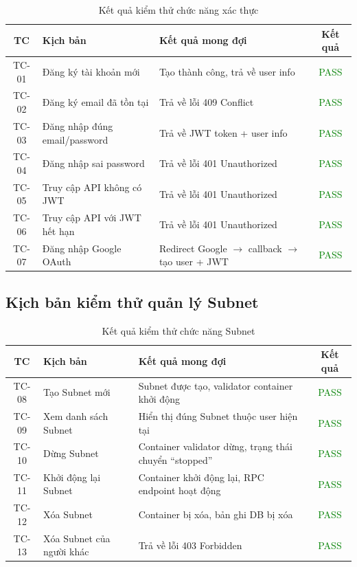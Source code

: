 \begin{table}[H]
\centering
\caption{Kết quả kiểm thử chức năng xác thực}
\label{tab:test_auth}
\begin{tabular}{|c|p{4cm}|p{4cm}|c|}
\hline
\textbf{TC} & \textbf{Kịch bản} & \textbf{Kết quả mong đợi} & \textbf{Kết quả} \\ \hline
TC-01 & Đăng ký tài khoản mới & Tạo thành công, trả về user info & \textcolor{green}{PASS} \\ \hline
TC-02 & Đăng ký email đã tồn tại & Trả về lỗi 409 Conflict & \textcolor{green}{PASS} \\ \hline
TC-03 & Đăng nhập đúng email/password & Trả về JWT token + user info & \textcolor{green}{PASS} \\ \hline
TC-04 & Đăng nhập sai password & Trả về lỗi 401 Unauthorized & \textcolor{green}{PASS} \\ \hline
TC-05 & Truy cập API không có JWT & Trả về lỗi 401 Unauthorized & \textcolor{green}{PASS} \\ \hline
TC-06 & Truy cập API với JWT hết hạn & Trả về lỗi 401 Unauthorized & \textcolor{green}{PASS} \\ \hline
TC-07 & Đăng nhập Google OAuth & Redirect Google $\rightarrow$ callback $\rightarrow$ tạo user + JWT & \textcolor{green}{PASS} \\ \hline
\end{tabular}
\end{table}

\subsection{Kịch bản kiểm thử quản lý Subnet}

\begin{table}[H]
\centering
\caption{Kết quả kiểm thử chức năng Subnet}
\label{tab:test_subnet}
\begin{tabular}{|c|p{4cm}|p{4cm}|c|}
\hline
\textbf{TC} & \textbf{Kịch bản} & \textbf{Kết quả mong đợi} & \textbf{Kết quả} \\ \hline
TC-08 & Tạo Subnet mới & Subnet được tạo, validator container khởi động & \textcolor{green}{PASS} \\ \hline
TC-09 & Xem danh sách Subnet & Hiển thị đúng Subnet thuộc user hiện tại & \textcolor{green}{PASS} \\ \hline
TC-10 & Dừng Subnet & Container validator dừng, trạng thái chuyển ``stopped'' & \textcolor{green}{PASS} \\ \hline
TC-11 & Khởi động lại Subnet & Container khởi động lại, RPC endpoint hoạt động & \textcolor{green}{PASS} \\ \hline
TC-12 & Xóa Subnet & Container bị xóa, bản ghi DB bị xóa & \textcolor{green}{PASS} \\ \hline
TC-13 & Xóa Subnet của người khác & Trả về lỗi 403 Forbidden & \textcolor{green}{PASS} \\ \hline
\end{tabular}
\end{table}

